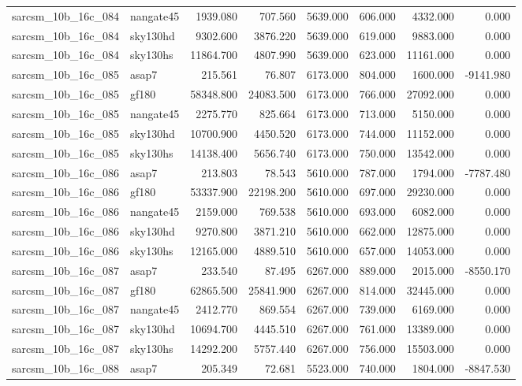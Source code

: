 \begin{tabular}{llrrrrrr}
sarcsm\_10b\_16c\_084 & nangate45 & 1939.080 & 707.560 & 5639.000 & 606.000 & 4332.000 & 0.000 \\
sarcsm\_10b\_16c\_084 & sky130hd & 9302.600 & 3876.220 & 5639.000 & 619.000 & 9883.000 & 0.000 \\
sarcsm\_10b\_16c\_084 & sky130hs & 11864.700 & 4807.990 & 5639.000 & 623.000 & 11161.000 & 0.000 \\
sarcsm\_10b\_16c\_085 & asap7 & 215.561 & 76.807 & 6173.000 & 804.000 & 1600.000 & -9141.980 \\
sarcsm\_10b\_16c\_085 & gf180 & 58348.800 & 24083.500 & 6173.000 & 766.000 & 27092.000 & 0.000 \\
sarcsm\_10b\_16c\_085 & nangate45 & 2275.770 & 825.664 & 6173.000 & 713.000 & 5150.000 & 0.000 \\
sarcsm\_10b\_16c\_085 & sky130hd & 10700.900 & 4450.520 & 6173.000 & 744.000 & 11152.000 & 0.000 \\
sarcsm\_10b\_16c\_085 & sky130hs & 14138.400 & 5656.740 & 6173.000 & 750.000 & 13542.000 & 0.000 \\
sarcsm\_10b\_16c\_086 & asap7 & 213.803 & 78.543 & 5610.000 & 787.000 & 1794.000 & -7787.480 \\
sarcsm\_10b\_16c\_086 & gf180 & 53337.900 & 22198.200 & 5610.000 & 697.000 & 29230.000 & 0.000 \\
sarcsm\_10b\_16c\_086 & nangate45 & 2159.000 & 769.538 & 5610.000 & 693.000 & 6082.000 & 0.000 \\
sarcsm\_10b\_16c\_086 & sky130hd & 9270.800 & 3871.210 & 5610.000 & 662.000 & 12875.000 & 0.000 \\
sarcsm\_10b\_16c\_086 & sky130hs & 12165.000 & 4889.510 & 5610.000 & 657.000 & 14053.000 & 0.000 \\
sarcsm\_10b\_16c\_087 & asap7 & 233.540 & 87.495 & 6267.000 & 889.000 & 2015.000 & -8550.170 \\
sarcsm\_10b\_16c\_087 & gf180 & 62865.500 & 25841.900 & 6267.000 & 814.000 & 32445.000 & 0.000 \\
sarcsm\_10b\_16c\_087 & nangate45 & 2412.770 & 869.554 & 6267.000 & 739.000 & 6169.000 & 0.000 \\
sarcsm\_10b\_16c\_087 & sky130hd & 10694.700 & 4445.510 & 6267.000 & 761.000 & 13389.000 & 0.000 \\
sarcsm\_10b\_16c\_087 & sky130hs & 14292.200 & 5757.440 & 6267.000 & 756.000 & 15503.000 & 0.000 \\
sarcsm\_10b\_16c\_088 & asap7 & 205.349 & 72.681 & 5523.000 & 740.000 & 1804.000 & -8847.530 \\

\end{tabular}
